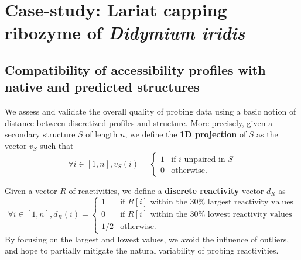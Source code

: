\documentclass[11pt]{article} %
\begin{document}





\section*{Case-study: Lariat capping ribozyme of {\itshape Didymium iridis}}
\subsection*{Compatibility of accessibility profiles with native and predicted structures}
We assess and validate the overall quality of probing data using a basic notion of distance between discretized profiles and structure. More precisely, given a secondary structure $S$ of length $n$, we define the {\bf 1D projection} of $S$ as the vector $v_S$ such that
$$ \forall i\in[1,n], v_S(i)=\begin{cases} 1 &\text{if $i$ unpaired in $S$}\\ 0 &\text{otherwise.} \end{cases} $$

Given a vector $R$ of reactivities, we define a {\bf discrete reactivity} vector $d_R$ as
$$ \forall i\in[1,n], d_R(i)=\begin{cases} 1 &\text{if $R[i]$ within the $30\%$ largest reactivity values}\\ 
0 & \text{if $R[i]$ within the $30\%$ lowest reactivity values}\\
1/2 &\text{otherwise.} \end{cases} $$
By focusing on the largest and lowest values, we avoid the influence of outliers, and hope to partially mitigate the natural variability of probing reactivities.
\end{document}
